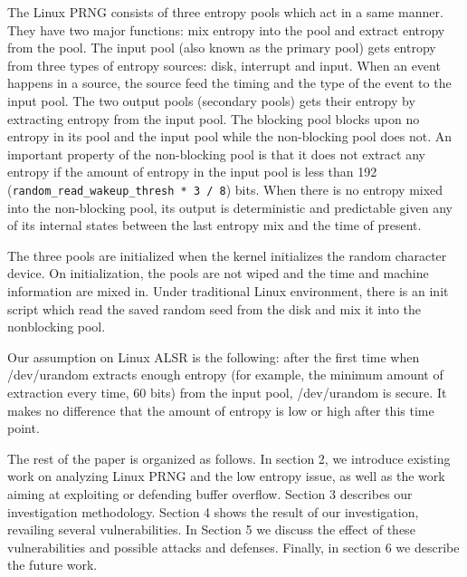 The Linux PRNG consists of three entropy pools which act in a same manner. They have two major functions: mix entropy into the pool and extract entropy from the pool. The input pool (also known as the primary pool) gets entropy from three types of entropy sources: disk, interrupt and input. When an event happens in a source, the source feed the timing and the type of the event to the input pool. The two output pools (secondary pools) gets their entropy by extracting entropy from the input pool. The blocking pool blocks upon no entropy in its pool and the input pool while the non-blocking pool does not. An important property of the non-blocking pool is that it does not extract any entropy if the amount of entropy in the input pool is less than 192 (\verb|random_read_wakeup_thresh * 3 / 8|) bits. When there is no entropy mixed into the non-blocking pool, its output is deterministic and predictable given any of its internal states between the last entropy mix and the time of present. 

The three pools are initialized when the kernel initializes the random character device. On initialization, the pools are not wiped and the time and machine information are mixed in. Under traditional Linux environment, there is an init script which read the saved random seed from the disk and mix it into the nonblocking pool.

Our assumption on Linux ALSR is the following: after the first time when /dev/urandom extracts enough entropy (for example, the minimum amount of extraction every time, 60 bits) from the input pool, /dev/urandom is secure. It makes no difference that the amount of entropy is low or high after this time point. 


The rest of the paper is organized as follows. In section 2, we introduce existing work on analyzing Linux PRNG and the low entropy issue, as well as the work aiming at exploiting or defending buffer overflow. Section 3 describes our investigation methodology. Section 4 shows the result of our investigation, revailing several vulnerabilities. In Section 5 we discuss the effect of these vulnerabilities and possible attacks and defenses. Finally, in section 6 we describe the future work.
